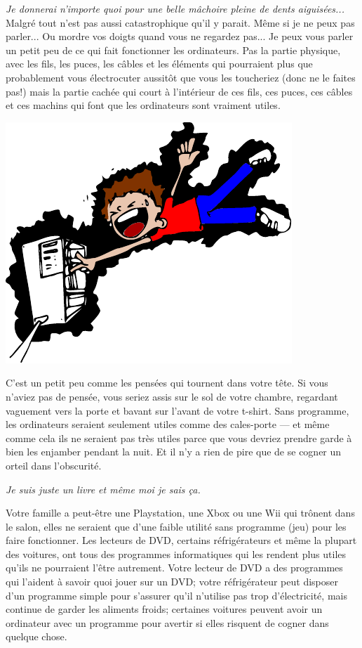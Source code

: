\emph{Je donnerai n'importe quoi pour une belle mâchoire pleine de dents aiguisées...}\\


Malgré tout n'est pas aussi catastrophique qu'il y parait. Même si je ne peux pas parler... Ou mordre vos doigts quand vous ne regardez pas... Je peux vous parler un petit peu de ce qui fait fonctionner les ordinateurs. Pas la partie physique, avec les fils, les puces, les câbles et les éléments qui pourraient plus que probablement vous électrocuter aussitôt que vous les toucheriez (donc ne le faites pas!) mais la partie cachée qui court à l'intérieur de ces fils, ces puces, ces câbles et ces machins qui font que les ordinateurs sont vraiment utiles. 

\begin{center}
\includegraphics[scale=1]{images/electrocution.pdf} 
\end{center} 

C'est un petit peu comme les pensées qui tournent dans votre tête. Si vous n'aviez pas de pensée, vous seriez assis sur le sol de votre chambre, regardant vaguement vers la porte et bavant sur l'avant de votre t-shirt. Sans programme, les ordinateurs seraient seulement utiles comme des cales-porte --- et même comme cela ils ne seraient pas très utiles parce que vous devriez prendre garde à bien les enjamber pendant la nuit. Et il n'y a rien de pire que de se cogner un orteil dans l'obscurité.

\bigskip
\emph {Je suis juste un livre et même moi je sais ça.}

\bigskip
Votre famille a peut-être une Playstation, une Xbox ou une Wii qui trônent dans le salon, elles ne seraient que d'une faible utilité sans programme (jeu) pour les faire fonctionner. Les lecteurs de DVD, certains réfrigérateurs et même la plupart des voitures, ont tous des programmes informatiques qui les rendent plus utiles qu'ils ne pourraient l'être autrement. Votre lecteur de DVD a des programmes qui l'aident à savoir quoi jouer sur un DVD; votre réfrigérateur peut disposer d'un programme simple pour s'assurer qu'il n'utilise pas trop d'électricité, mais continue de garder les aliments froids; certaines voitures peuvent avoir un ordinateur avec un programme pour avertir si elles risquent de cogner dans quelque chose.

